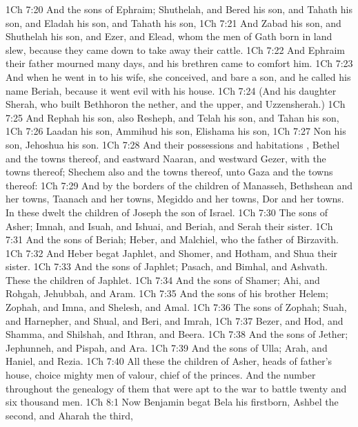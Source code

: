 \vs 1Ch 7:20 And the sons of Ephraim; Shuthelah, and Bered his son, and Tahath his son, and Eladah his son, and Tahath his son,
\vs 1Ch 7:21 And Zabad his son, and Shuthelah his son, and Ezer, and Elead, whom the men of Gath  born in  land slew, because they came down to take away their cattle.
\vs 1Ch 7:22 And Ephraim their father mourned many days, and his brethren came to comfort him.
\vs 1Ch 7:23 And when he went in to his wife, she conceived, and bare a son, and he called his name Beriah, because it went evil with his house.
\vs 1Ch 7:24 (And his daughter  Sherah, who built Bethhoron the nether, and the upper, and Uzzensherah.)
\vs 1Ch 7:25 And Rephah  his son, also Resheph, and Telah his son, and Tahan his son,
\vs 1Ch 7:26 Laadan his son, Ammihud his son, Elishama his son,
\vs 1Ch 7:27 Non his son, Jehoshua his son.
\vs 1Ch 7:28 And their possessions and habitations , Bethel and the towns thereof, and eastward Naaran, and westward Gezer, with the towns thereof; Shechem also and the towns thereof, unto Gaza and the towns thereof:
\vs 1Ch 7:29 And by the borders of the children of Manasseh, Bethshean and her towns, Taanach and her towns, Megiddo and her towns, Dor and her towns. In these dwelt the children of Joseph the son of Israel.
\vs 1Ch 7:30 The sons of Asher; Imnah, and Isuah, and Ishuai, and Beriah, and Serah their sister.
\vs 1Ch 7:31 And the sons of Beriah; Heber, and Malchiel, who  the father of Birzavith.
\vs 1Ch 7:32 And Heber begat Japhlet, and Shomer, and Hotham, and Shua their sister.
\vs 1Ch 7:33 And the sons of Japhlet; Pasach, and Bimhal, and Ashvath. These  the children of Japhlet.
\vs 1Ch 7:34 And the sons of Shamer; Ahi, and Rohgah, Jehubbah, and Aram.
\vs 1Ch 7:35 And the sons of his brother Helem; Zophah, and Imna, and Shelesh, and Amal.
\vs 1Ch 7:36 The sons of Zophah; Suah, and Harnepher, and Shual, and Beri, and Imrah,
\vs 1Ch 7:37 Bezer, and Hod, and Shamma, and Shilshah, and Ithran, and Beera.
\vs 1Ch 7:38 And the sons of Jether; Jephunneh, and Pispah, and Ara.
\vs 1Ch 7:39 And the sons of Ulla; Arah, and Haniel, and Rezia.
\vs 1Ch 7:40 All these  the children of Asher, heads of  father's house, choice  mighty men of valour, chief of the princes. And the number throughout the genealogy of them that were apt to the war  to battle  twenty and six thousand men.
\vs 1Ch 8:1 Now Benjamin begat Bela his firstborn, Ashbel the second, and Aharah the third,
